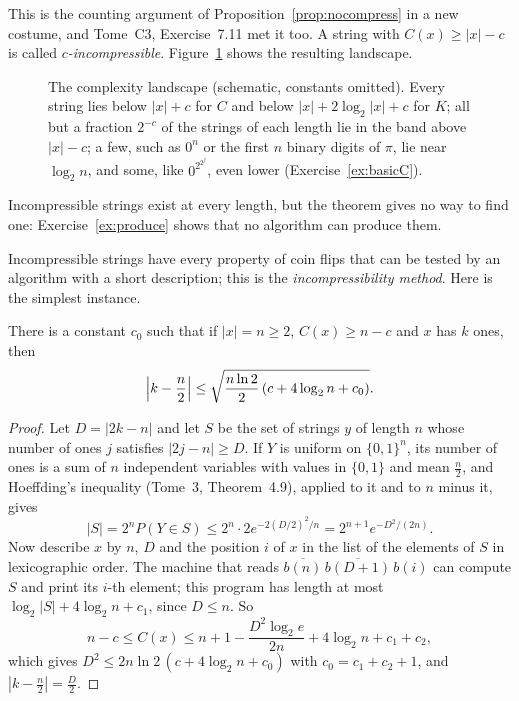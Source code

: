 This is the counting argument of Proposition~\ref{prop:nocompress} in a new costume, and Tome~C3, Exercise~7.11 met it too. A string with $C(x)\ge|x|-c$ is called \emph{$c$-incompressible}. Figure~\ref{fig:landscape} shows the resulting landscape.

\begin{figure}[ht]
\centering
{}
\caption{The complexity landscape (schematic, constants omitted). Every string lies below $|x|+c$ for $C$ and below $|x|+2\log_2|x|+c$ for $K$; all but a fraction $2^{-c}$ of the strings of each length lie in the band above $|x|-c$; a few, such as $0^n$ or the first $n$ binary digits of $\pi$, lie near $\log_2n$, and some, like $0^{2^{2^j}}$, even lower (Exercise~\ref{ex:basicC}).}
\label{fig:landscape}
\end{figure} Incompressible strings exist at every length, but the theorem gives no way to find one: Exercise~\ref{ex:produce} shows that no algorithm can produce them.

Incompressible strings have every property of coin flips that can be tested by an algorithm with a short description; this is the \emph{incompressibility method}. Here is the simplest instance.

\begin{proposition}\label{prop:balanced}
There is a constant $c_0$ such that if $|x|=n\ge2$, $C(x)\ge n-c$ and $x$ has $k$ ones, then
\[
\Bigl|k-\frac n2\Bigr|\le\sqrt{\frac{n\ln2}2\,(c+4\log_2n+c_0)}.
\]
\end{proposition}

\begin{proof}
Let $D=|2k-n|$ and let $S$ be the set of strings $y$ of length $n$ whose number of ones $j$ satisfies $|2j-n|\ge D$. If $Y$ is uniform on $\{0,1\}^n$, its number of ones is a sum of $n$ independent variables with values in $\{0,1\}$ and mean $\frac n2$, and Hoeffding's inequality (Tome~3, Theorem~4.9), applied to it and to $n$ minus it, gives
\[
|S|=2^nP(Y\in S)\le2^n\cdot2e^{-2(D/2)^2/n}=2^{n+1}e^{-D^2/(2n)}.
\]
Now describe $x$ by $n$, $D$ and the position $i$ of $x$ in the list of the elements of $S$ in lexicographic order. The machine that reads $\overline{b(n)}\,\overline{b(D+1)}\,b(i)$ can compute $S$ and print its $i$-th element; this program has length at most $\log_2|S|+4\log_2n+c_1$, since $D\le n$. So
\[
n-c\le C(x)\le n+1-\frac{D^2\log_2e}{2n}+4\log_2n+c_1+c_2,
\]
which gives $D^2\le2n\ln2\,(c+4\log_2n+c_0)$ with $c_0=c_1+c_2+1$, and $|k-\frac n2|=\frac D2$.
\end{proof}

